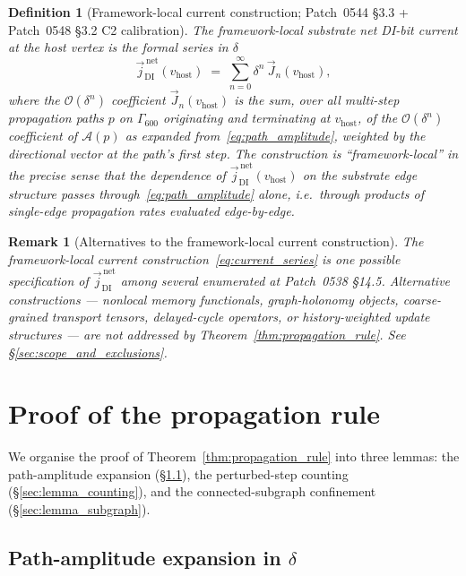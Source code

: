 \documentclass[11pt,letterpaper]{article}
\newtheorem{definition}[theorem]{Definition}
\newtheorem{remark}[theorem]{Remark}
\newcommand{\vhost}{v_{\text{host}}}
\newcommand{\jDInet}{\vec{j}_{\text{DI}}^{\,\text{net}}}
\newcommand{\Eorder}[1]{\mathcal{O}(\delta^{#1})}
\newcommand{\Gsixcell}{\Gamma_{600}}
\begin{document}
\begin{definition}[Framework-local current construction; Patch~0544 \S3.3 + Patch~0548 \S3.2 C2 calibration]\label{def:framework_local_current}
The framework-local substrate net DI-bit current at the host vertex is the formal series in $\delta$
\begin{equation}\label{eq:current_series}
\jDInet(\vhost) \;=\; \sum_{n=0}^{\infty} \delta^n \, \vec{J}_n(\vhost),
\end{equation}
where the $\Eorder{n}$ coefficient $\vec{J}_n(\vhost)$ is the sum, over all multi-step propagation paths $p$ on $\Gsixcell$ originating and terminating at $\vhost$, of the $\Eorder{n}$ coefficient of $\mathcal{A}(p)$ as expanded from~\eqref{eq:path_amplitude}, weighted by the directional vector at the path's first step. The construction is ``framework-local'' in the precise sense that the dependence of $\jDInet(\vhost)$ on the substrate edge structure passes through~\eqref{eq:path_amplitude} alone, i.e.\ through products of single-edge propagation rates evaluated edge-by-edge.
\end{definition}

\begin{remark}[Alternatives to the framework-local current construction]\label{rem:alternative_constructions}
The framework-local current construction~\eqref{eq:current_series} is one possible specification of $\jDInet$ among several enumerated at Patch~0538 \S14.5. Alternative constructions --- nonlocal memory functionals, graph-holonomy objects, coarse-grained transport tensors, delayed-cycle operators, or history-weighted update structures --- are not addressed by Theorem~\ref{thm:propagation_rule}. See \S\ref{sec:scope_and_exclusions}.
\end{remark}

\section{Proof of the propagation rule}\label{sec:proof_propagation_rule}

We organise the proof of Theorem~\ref{thm:propagation_rule} into three lemmas: the path-amplitude expansion (\S\ref{sec:lemma_expansion}), the perturbed-step counting (\S\ref{sec:lemma_counting}), and the connected-subgraph confinement (\S\ref{sec:lemma_subgraph}).

\subsection{Path-amplitude expansion in $\delta$}\label{sec:lemma_expansion}
\end{document}
